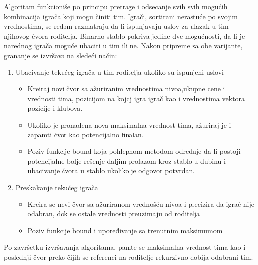 \documentclass[a4paper]{article}
\begin{document}
Algoritam funkcioniše po principu pretrage i odsecanje svih svih mogućih kombinacija igrača koji mogu činiti tim. Igrači, sortirani nerastuće po svojim vrednostima, se redom razmatraju da li ispunjavaju uslov za ulazak u tim njihovog čvora roditelja. Binarno stablo pokriva jedine dve mogućnosti, da li je narednog igrača moguće ubaciti u tim ili ne. Nakon pripreme za obe varijante, grananje se izvršava na sledeći način: 

\begin{enumerate}
  \item Ubacivanje tekućeg igrača u tim roditelja ukoliko su ispunjeni uslovi 
  \vspace{1mm}
  \begin{itemize}
	\item Kreiraj novi čvor sa ažuriranim vrednostima nivoa,ukupne cene i vrednosti tima, pozicijom na kojoj igra igrač kao i vrednostima vektora pozicije i klubova.  
	\vspace{1mm}
	\item Ukoliko je pronađena nova maksimalna vrednost tima, ažuriraj je i zapamti čvor kao potencijalno finalan.
	\vspace{1mm}
	\item Poziv funkcije bound koja pohlepnom metodom određuje da li postoji potencijalno bolje rešenje daljim prolazom kroz stablo u dubinu i ubacivanje čvora u stablo ukoliko je odgovor potvrdan.
	
  \end{itemize}
  \vspace{1mm}
  \item Preskakanje tekućeg igrača 
  \vspace{1mm}
  \begin{itemize}
	\item Kreira se novi čvor sa ažuriranom vrednošću nivoa i precizira da igrač nije odabran, dok se ostale vrednosti preuzimaju od roditelja
	\vspace{1mm}
	\item Poziv funkcije bound i upoređivanje sa trenutnim maksimumom
	
  \end{itemize}
\end{enumerate} 
\vspace{3mm} 

Po završetku izvršavanja algoritama, pamte se maksimalna vrednost tima kao i poslednji čvor preko čijih se referenci na roditelje rekurzivno dobija odabrani tim.


\end{document}
